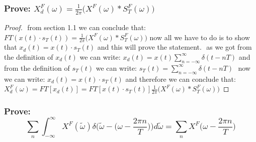 \documentclass{article}
\begin{document}
\subsubsection{Prove: $X^F_d(\omega) = \frac{1}{2\pi}\big(X^F(\omega) \ast S^F_T (\omega)\big)$}
\begin{proof}
    $ $\newline
    from section 1.1 we can conclude that: $FT(x(t) \cdot s_T(t)) = \frac{1}{2\pi}\big(X^F(\omega) \ast S^F_T (\omega)\big)$ 
    now all we have to do is to show that $x_d(t)=x(t)\cdot s_T(t)$ and this will prove the statement.
    $ $\newline
    as we got from the definition of $x_d(t)$ we can write: $x_d(t)= x(t) \sum^{\infty}_{n=-\infty} \delta(t-nT)$ and from the definition of $s_T(t)$ we can write: $s_T(t) = \sum^{\infty}_{n=-\infty} \delta(t-nT)$
    $ $\newline
    now we can write: $x_d(t)= x(t) \cdot s_T(t)$ 
    $ $\newline and therefore we can conclude that: $X^F_d(\omega) =FT[x_d(t)] = FT[x(t)\cdot s_T(t)] \frac{1}{2\pi}\big(X^F(\omega) \ast S^F_T (\omega)\big)$
\end{proof} 

\subsubsection{Prove: \[\sum_n \int^\infty_{-\infty} X^F(\tilde{\omega})\delta\bigg(\tilde{\omega}-\bigg(\omega-\frac{2\pi n}{T}\bigg)\bigg)d\tilde{\omega} = \sum_n X^F\bigg(\omega - \frac{2\pi n}{T}\bigg) \]}
\end{document}
